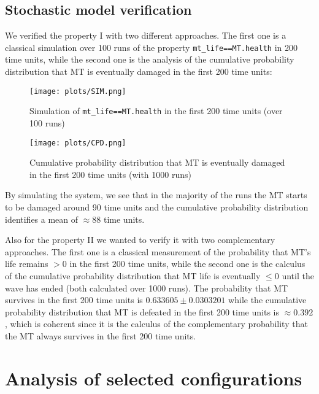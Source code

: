 \documentclass[
10pt, %
a4paper, %
oneside, %
headinclude,footinclude, %
BCOR5mm, %
]{scrartcl}
\begin{document}
		\subsection{Stochastic model verification}
			We verified the property I with two different approaches. The first one is a classical simulation over 100 runs of the property \texttt{mt\_life==MT.health} in 200 time units, while the second one is the analysis of the cumulative probability distribution that MT is eventually damaged in the first 200 time units:
			\begin{figure}[H]
				\centering
				\begin{minipage}{.45\textwidth}
					\centering
					\texttt{[image: plots/SIM.png]}
					\caption{Simulation of \texttt{mt\_life==MT.health} in the first 200 time units (over 100 runs)}
				\end{minipage}
				\begin{minipage}{.45\textwidth}
					\centering
					\texttt{[image: plots/CPD.png]}
					\caption{Cumulative probability distribution that MT is eventually damaged in the first 200 time units (with 1000 runs)}
				\end{minipage}
			\end{figure}
			By simulating the system, we see that in the majority of the runs the MT starts to be damaged around 90 time units and the cumulative probability distribution identifies a mean of $\approx88$ time units.
			
			Also for the property II we wanted to verify it with two complementary approaches. The first one is a classical measurement of the probability that MT's life remains $>0$ in the first 200 time units, while the second one is the calculus of the cumulative probability distribution that MT life is eventually $\leq0$ until the wave has ended (both calculated over 1000 runs). The probability that MT survives in the first 200 time units is $0.633605\pm 0.0303201$ while the cumulative probability distribution that MT is defeated in the first 200 time units is $\approx 0.392$, which is coherent since it is the calculus of the complementary probability that the MT always survives in the first 200 time units.
			
	\section{Analysis of selected configurations}
\end{document}

